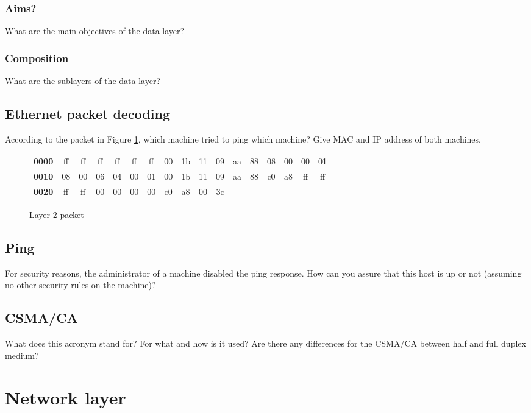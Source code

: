 \documentclass[11pt]{article}
\begin{document}
\subsubsection{Aims?}
What are the main objectives of the data layer?
\subsubsection{Composition}
What are the sublayers of the data layer?
\subsection{Ethernet packet decoding}
According to the packet in Figure \ref{fig:arp_req_ex}, which machine tried to ping which machine? Give MAC and IP address of both machines.
  \begin{figure}[h]
  \centering
  \resizebox{16cm}{!} {
    \begin{tabular}{lcccccccccccccccc}
      \textbf{0000} & ff & ff & ff & ff & ff & ff & 00 & 1b     & 11 & 09 & aa & 88 & 08 & 00 & 00 & 01 \\
      \textbf{0010} & 08 & 00 & 06 & 04 & 00 & 01 & 00 & 1b     & 11 & 09 & aa & 88 & c0 & a8 & ff & ff \\
      \textbf{0020} & ff & ff & 00 & 00 & 00 & 00 & c0 & a8     & 00 & 3c \\
    \end{tabular}
  }
  \caption{Layer 2 packet}
  \label{fig:arp_req_ex}
  \end{figure}
\subsection{Ping}
For security reasons, the administrator of a machine disabled the ping response. How can you assure that this host is up or not (assuming no other security rules on the machine)?
\subsection{CSMA/CA}
What does this acronym stand for? For what and how is it used? Are there any differences for the CSMA/CA between half and full duplex medium?

\section{Network layer}
\end{document}

